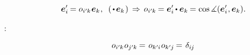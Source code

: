 \nopagebreak\vspace{-0.25em}\begin{equation}
\bm{e}'_{i} \hspace{-0.16ex} = \cosinematrix{i'\hspace{-0.1ex}k} \hspace{.1ex} \bm{e}_k \hspace{.1ex}, \;\:
(\hspace{.32ex} \dotp \hspace{.33ex} \bm{e}_k \hspace{.15ex})
\, \Rightarrow \hspace{.33ex}
\cosinematrix{i'\hspace{-0.1ex}k} \hspace{-0.16ex} = \bm{e}'_{i} \hspace{-0.15ex} \dotp \bm{e}_k \hspace{-0.16ex} = \operatorname{cos} \measuredangle (\bm{e}'_{i} \hspace{.1ex}, \bm{e}_k).
\end{equation}

\vspace{-0.1em} :

\en{\vspace{-1.2em}}\ru{\vspace{-0.6em}}\begin{equation}\label{orthogonalityofcosinematricies}
o_{i'\hspace{-0.1ex}k} \hspace{.1ex} o_{j'\hspace{-0.1ex}k} \hspace{-0.16ex} = \hspace{.2ex} o_{k'\hspace{-0.1ex}i} \hspace{.1ex} o_{k'\hspace{-0.1ex}j} \hspace{-0.16ex} = \hspace{.2ex} \delta_{i\hspace{-0.1ex}j}
\end{equation}

